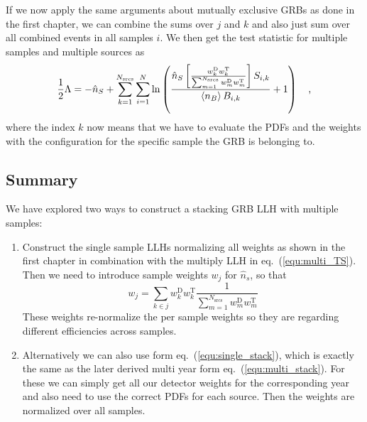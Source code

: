 If we now apply the same arguments about mutually exclusive GRBs as done in the first chapter, we can combine the sums over $j$ and $k$ and also just sum over all combined events in all samples $i$.
We then get the test statistic for multiple samples and multiple sources as
\begin{equation}
  \frac{1}{2}\Lambda
  = -\hat{n}_S + \sum_{k=1}^{N_\text{srcs}}\sum_{i=1}^{N} \ln\left(
        \frac{\hat{n}_S \left[
                \frac{ w_k^\text{D}w_k^\text{T} }
                     {\sum_{m=1}^{N_\text{srcs}} w^\text{D}_m w^\text{T}_m}
                \right] S_{i,k}}
             {\Braket{n_B} B_{i, k}} + 1 \right)
   \quad\text{,}
   \label{equ:multi_stack}
\end{equation}
where the index $k$ now means that we have to evaluate the PDFs and the weights with the configuration for the specific sample the GRB is belonging to.

\subsection{Summary}
We have explored two ways to construct a stacking GRB LLH with multiple samples:
\begin{enumerate}
  \item Construct the single sample LLHs normalizing all weights as shown in the first chapter in combination with the multiply LLH in eq.~(\ref{equ:multi_TS}).
  Then we need to introduce sample weights $w_j$ for $\hat{n}_s$, so that
  \begin{equation}
    w_j = \sum_{k\in j} w^\text{D}_k w^\text{T}_k
          \frac{1}{\sum_{m=1}^{N_\text{srcs}} w^\text{D}_m w^\text{T}_m}
  \end{equation}
  These weights re-normalize the per sample weights so they are regarding different efficiencies across samples.

  \item Alternatively we can also use form eq.~(\ref{equ:single_stack}), which is exactly the same as the later derived multi year form eq.~(\ref{equ:multi_stack}).
  For these we can simply get all our detector weights for the corresponding year and also need to use the correct PDFs for each source.
  Then the weights are normalized over all samples.
\end{enumerate}


